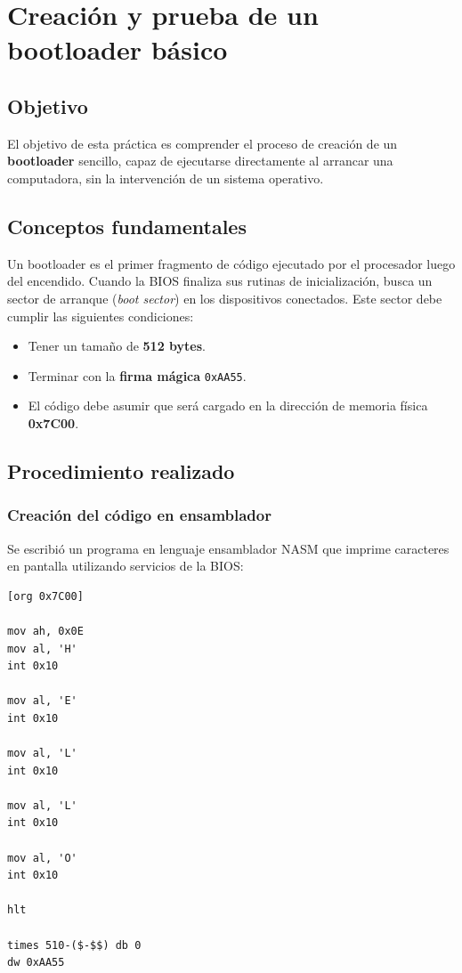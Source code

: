 \section{Creación y prueba de un bootloader básico}

\subsection{Objetivo}

El objetivo de esta práctica es comprender el proceso de creación de un \textbf{bootloader} sencillo, capaz de ejecutarse directamente al arrancar una computadora, sin la intervención de un sistema operativo.

\subsection{Conceptos fundamentales}

Un bootloader es el primer fragmento de código ejecutado por el procesador luego del encendido. Cuando la BIOS finaliza sus rutinas de inicialización, busca un sector de arranque (\textit{boot sector}) en los dispositivos conectados. Este sector debe cumplir las siguientes condiciones:
\begin{itemize}
    \item Tener un tamaño de \textbf{512 bytes}.
    \item Terminar con la \textbf{firma mágica} \texttt{0xAA55}.
    \item El código debe asumir que será cargado en la dirección de memoria física \textbf{0x7C00}.
\end{itemize}

\subsection{Procedimiento realizado}

\subsubsection{Creación del código en ensamblador}

Se escribió un programa en lenguaje ensamblador NASM que imprime caracteres en pantalla utilizando servicios de la BIOS:

\begin{lstlisting}[language={[x86masm]Assembler}, caption={Código del bootloader básico}]
[org 0x7C00]

mov ah, 0x0E
mov al, 'H'
int 0x10

mov al, 'E'
int 0x10

mov al, 'L'
int 0x10

mov al, 'L'
int 0x10

mov al, 'O'
int 0x10

hlt

times 510-($-$$) db 0
dw 0xAA55
\end{lstlisting}

